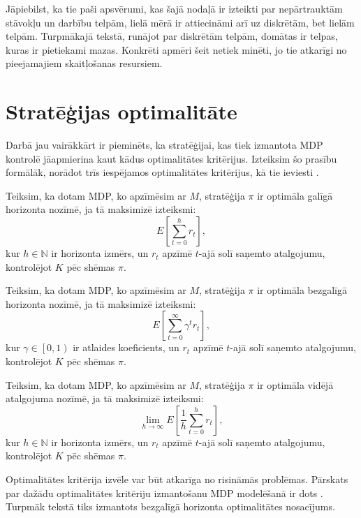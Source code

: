 \documentclass{ludis} %
\begin{document}



Jāpiebilst, ka tie paši apsvērumi, kas šajā nodaļā ir izteikti par nepārtrauktām stāvokļu un darbību telpām, lielā mērā ir attiecināmi arī uz diskrētām, bet lielām telpām.
Turpmākajā tekstā, runājot par diskrētām telpām, domātas ir telpas, kuras ir pietiekami mazas.
Konkrēti apmēri šeit netiek minēti, jo tie atkarīgi no pieejamajiem skaitļošanas resursiem.

\section{Stratēģijas optimalitāte}
Darbā jau vairākkārt ir pieminēts, ka stratēģijai, kas tiek izmantota MDP kontrolē jāapmierina kaut kādus optimalitātes kritērijus.
Izteiksim šo prasību formālāk, norādot trīs iespējamos optimalitātes kritērijus, kā tie ieviesti \autocite{Otterlo}.

\begin{definicija}
Teiksim, ka dotam MDP, ko apzīmēsim ar $M$, stratēģija $\pi$ ir optimāla galīgā horizonta nozīmē, ja tā maksimizē izteiksmi:
\[
	E\left[\sum_{t=0}^{h}r_t\right],
\]
kur $h \in \mathbb{N}$ ir horizonta izmērs, un $r_t$ apzīmē $t$-ajā solī saņemto atalgojumu, kontrolējot $K$ pēc shēmas $\pi$.
\end{definicija}

\begin{definicija}
Teiksim, ka dotam MDP, ko apzīmēsim ar $M$, stratēģija $\pi$ ir optimāla bezgalīgā horizonta nozīmē, ja tā maksimizē izteiksmi:
\[
	E\left[\sum_{t=0}^{\infty}\gamma^t r_t\right],
\]
kur $\gamma \in \left[0, 1\right)$ ir atlaides koeficients, un $r_t$ apzīmē $t$-ajā solī saņemto atalgojumu, kontrolējot $K$ pēc shēmas $\pi$.
\end{definicija}

\begin{definicija}
Teiksim, ka dotam MDP, ko apzīmēsim ar $M$, stratēģija $\pi$ ir optimāla vidējā atalgojuma nozīmē, ja tā maksimizē izteiksmi:
\[
	\lim\limits_{h \rightarrow \infty} E\left[\frac{1}{h}\sum_{t=0}^{h}r_t\right],
\]
kur $h \in \mathbb{N}$ ir horizonta izmērs, un $r_t$ apzīmē $t$-ajā solī saņemto atalgojumu, kontrolējot $K$ pēc shēmas $\pi$.
\end{definicija}

Optimalitātes kritērija izvēle var būt atkarīga no risināmās problēmas. Pārskats par dažādu optimalitātes kritēriju izmantošanu MDP modelēšanā ir dots \autocite{koenig2002interaction}.
Turpmāk tekstā tiks izmantots bezgalīgā horizonta optimalitātes nosacījums.
\end{document}
